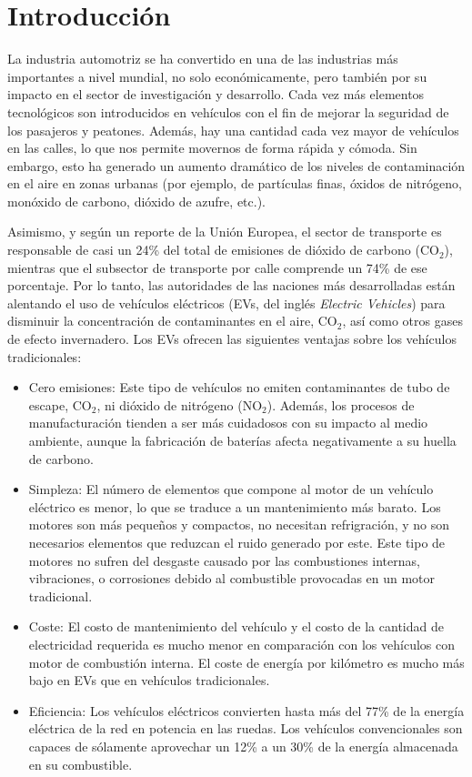 \chapter*{Introducción}

La industria automotriz se ha convertido en una de las industrias más importantes a nivel mundial, no solo económicamente, pero también por su impacto en el sector de investigación y desarrollo. Cada vez más elementos tecnológicos son introducidos en vehículos con el fin de mejorar la seguridad de los pasajeros y peatones. Además, hay una cantidad cada vez mayor de vehículos en las calles, lo que nos permite movernos de forma rápida y cómoda. Sin embargo, esto ha generado un aumento dramático de los niveles de contaminación en el aire en zonas urbanas (por ejemplo, de partículas finas, óxidos de nitrógeno, monóxido de carbono, dióxido de azufre, etc.).

Asimismo, y según un reporte de la Unión Europea, el sector de transporte es responsable de casi un 24\% del total de emisiones de dióxido de carbono (CO$_2$), mientras que el subsector de transporte por calle comprende un 74\% de ese porcentaje. Por lo tanto, las autoridades de las naciones más desarrolladas están alentando el uso de vehículos eléctricos (EVs, del inglés \emph{Electric Vehicles}) para disminuir la concentración de contaminantes en el aire, CO$_2$, así como otros gases de efecto invernadero. Los EVs ofrecen las siguientes ventajas sobre los vehículos tradicionales:

\begin{itemize}
    \item Cero emisiones: Este tipo de vehículos no emiten contaminantes de tubo de escape, CO$_2$, ni dióxido de nitrógeno (NO$_2$). Además, los procesos de manufacturación tienden a ser más cuidadosos con su impacto al medio ambiente, aunque la fabricación de baterías afecta negativamente a su huella de carbono.
    \item Simpleza: El número de elementos que compone al motor de un vehículo eléctrico es menor, lo que se traduce a un mantenimiento más barato. Los motores son más pequeños y compactos, no necesitan refrigración, y no son necesarios elementos que reduzcan el ruido generado por este. Este tipo de motores no sufren del desgaste causado por las combustiones internas, vibraciones, o corrosiones debido al combustible provocadas en un motor tradicional.
    \item Coste: El costo de mantenimiento del vehículo y el costo de la cantidad de electricidad requerida es mucho menor en comparación con los vehículos con motor de combustión interna. El coste de energía por kilómetro es mucho más bajo en EVs que en vehículos tradicionales.
    \item Eficiencia: Los vehículos eléctricos convierten hasta más del 77\% de la energía eléctrica de la red en potencia en las ruedas. Los vehículos convencionales son capaces de sólamente aprovechar un 12\% a un 30\% de la energía almacenada en su combustible. \cite{evefficiency}
\end{itemize}

